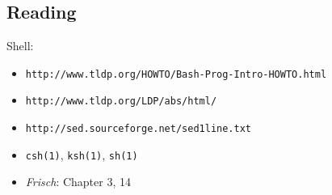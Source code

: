 \documentclass[xga]{xdvislides}
\begin{document}
\subsection{Reading}
Shell:
\begin{itemize}
	\item \verb+http://www.tldp.org/HOWTO/Bash-Prog-Intro-HOWTO.html+
	\item \verb+http://www.tldp.org/LDP/abs/html/+
	\item \verb+http://sed.sourceforge.net/sed1line.txt+
	\item \verb+csh(1)+, \verb+ksh(1)+, \verb+sh(1)+
	\item {\em Frisch}: Chapter 3, 14
\end{itemize}
\end{document}
